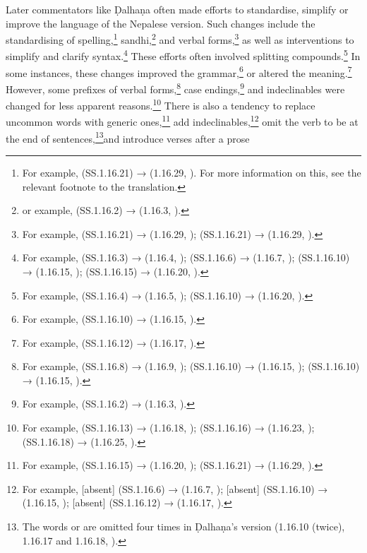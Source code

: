 Later commentators like Ḍalhaṇa often made efforts to standardise, simplify or improve 
the language of the Nepalese version. Such changes include the standardising of 
spelling,\footnote{For example,  (SS.1.16.21) →  (1.16.29, 
\cite[81]{vulgate}). For more information on this, see the relevant footnote to the 
translation.} sandhi,\footnote{or example,  (SS.1.16.2) → 
 (1.16.3, \cite[76]{vulgate}).} and verbal forms,\footnote{For example, 
 (SS.1.16.21) →  (1.16.29, \cite[81]{vulgate}); 
 (SS.1.16.21) →  (1.16.29, \cite[81]{vulgate}).} as well 
as interventions to simplify and clarify syntax.\footnote{For example, 
 (SS.1.16.3) →  (1.16.4, \cite[76]{vulgate}); 
 (SS.1.16.6) →  (1.16.7, 
\cite[77]{vulgate});  (SS.1.16.10) →  
(1.16.15, \cite[78]{vulgate});  (SS.1.16.15) →  (1.16.20, 
\cite[79]{vulgate}).} These efforts often involved splitting compounds.\footnote{For 
example, 
 (SS.1.16.4) →  
(1.16.5, \cite[76]{vulgate});  (SS.1.16.10) → 
 (1.16.20, \cite[78]{vulgate}).} In some instances, these 
changes improved the grammar,\footnote{For example,  
(SS.1.16.10) →  (1.16.15, \cite[78]{vulgate}).} or altered the 
meaning.\footnote{For example,  (SS.1.16.12) →  (1.16.17, \cite[79]{vulgate}).} However, some prefixes of verbal 
forms,\footnote{For example,  (SS.1.16.8) →  
(1.16.9, \cite[77]{vulgate});  (SS.1.16.10) →  (1.16.15, 
\cite[78]{vulgate});  (SS.1.16.10) →  (1.16.15, 
\cite[78]{vulgate}).} case endings,\footnote{For example,  (SS.1.16.2) → 
 (1.16.3, \cite[76]{vulgate}).} and indeclinables were changed for less apparent 
reasons.\footnote{For example,  (SS.1.16.13) →  (1.16.18, 
\cite[79]{vulgate});  (SS.1.16.16) →  (1.16.23, \cite[79]{vulgate}); 
 (SS.1.16.18) →  (1.16.25, \cite[80]{vulgate}).} There is also a tendency 
to replace uncommon words with generic ones,\footnote{For example,  
(SS.1.16.15) →  (1.16.20, \cite[79]{vulgate});  (SS.1.16.21) → 
 (1.16.29, \cite[81]{vulgate}).} add indeclinables,\footnote{For example, 
[absent]  (SS.1.16.6) →  (1.16.7, \cite[77]{vulgate}); [absent] (SS.1.16.10) → 
 (1.16.15, \cite[78]{vulgate}); [absent]  (SS.1.16.12) →  (1.16.17, 
\cite[79]{vulgate}).} omit the verb to be at the end of sentences,\footnote{The words 
 or  are omitted four times in Ḍalhaṇa's version (1.16.10 
(twice), 1.16.17 and 1.16.18, \cite[77, 79]{vulgate}).}and introduce verses after a prose 
